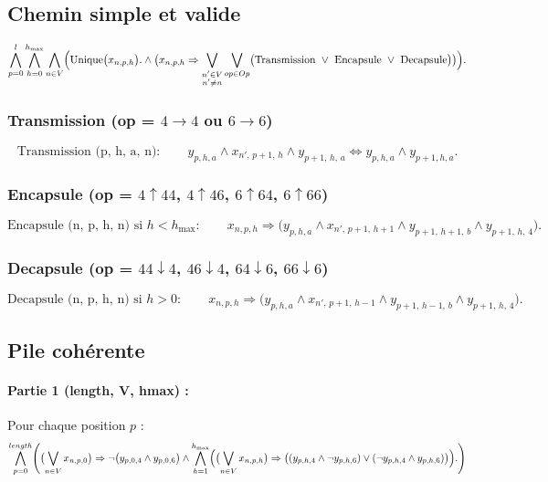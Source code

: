 \documentclass{article}
\begin{document}
\subsection{Chemin simple et valide}
\[
\bigwedge_{p=0}^{l} \bigwedge_{h=0}^{h_{\max}} \bigwedge_{n\in V} \Bigl( \text{Unique}\bigl(x_{n,p,h}\bigr).
\land
\bigl( x_{n,p,h} \Rightarrow
\bigvee_{\substack{n' \in V \\ n' \neq n}} \bigvee_{op \in Op}
\bigl(\text{Transmission}\ \lor\ \text{Encapsule}\ \lor\ \text{Decapsule}\bigr) \bigr) \Bigr).
\]

\subsubsection*{Transmission (op = $4\to 4$ ou $6\to 6$)}
\[
\text{Transmission (p, h, a, n\')}:\qquad
y_{p,h,a} \land x_{n',\,p+1,\,h} \land y_{p+1,\,h,\,a}
\iff y_{p,h,a} \land y_{p+1,h,a}.
\]

\subsubsection*{Encapsule (op = $4\uparrow44$, $4\uparrow46$, $6\uparrow64$, $6\uparrow66$)}
\[
\text{Encapsule (n, p, h, n\') si $h < h_{\max}$}:\qquad
x_{n,p,h} \Rightarrow
\bigl( y_{p,h,a} \land x_{n',\,p+1,\,h+1} \land y_{p+1,\,h+1,\,b} \land y_{p+1,\,h,\,4} \bigr).
\]

\subsubsection*{Decapsule (op = $44\downarrow4$, $46\downarrow4$, $64\downarrow6$, $66\downarrow6$)}
\[
\text{Decapsule (n, p, h, n\') si $h>0$}:\qquad
x_{n,p,h} \Rightarrow
\bigl( y_{p,h,a} \land x_{n',\,p+1,\,h-1} \land y_{p+1,\,h-1,\,b} \land y_{p+1,\,h,\,4} \bigr).
\]

\subsection{Pile cohérente}

\paragraph{Partie 1 (length, V, hmax) :}
Pour chaque position $p$ :
\[
\bigwedge_{p=0}^{length}\Biggl(
\bigl(\bigvee_{n\in V} x_{n,p,0}\bigr) \Rightarrow \lnot\bigl(y_{p,0,4}\land y_{p,0,6}\bigr) \land
\bigwedge_{h=1}^{h_{\max}} \Bigl(
\bigl(\bigvee_{n\in V} x_{n,p,h}\bigr) \Rightarrow 
\bigl((y_{p,h,4}\land \lnot y_{p,h,6}) \lor (\lnot y_{p,h,4}\land y_{p,h,6})\bigr)
\Bigr). \Biggr) 
\]
\end{document}

